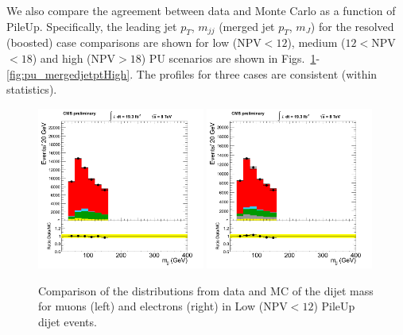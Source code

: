 We also compare the agreement between data and Monte Carlo as a function of PileUp. Specifically, the leading jet $p_T$, $m_{jj}$ (merged jet $p_T$, $m_J$) for the resolved (boosted) case comparisons are shown for low (NPV$<12$), medium ($12<$NPV$<18$) and high (NPV$>18$) PU scenarios are shown in Figs.~\ref{fig:pu_mjjLow}-\ref{fig:pu_mergedjetptHigh}. The profiles for three cases are consistent (within statistics).
\begin{figure}[h!t]
  {\centering
    \includegraphics[width=0.49\textwidth]{figs/puchecks/mu_LowNPV_mjj.png}
    \includegraphics[width=0.49\textwidth]{figs/puchecks/el_LowNPV_mjj.png}
    \caption{Comparison of the distributions from data and MC of the
    dijet mass for muons (left) and electrons (right)
    in Low (NPV$<12$) PileUp dijet events.}
\label{fig:pu_mjjLow}}
\end{figure}
